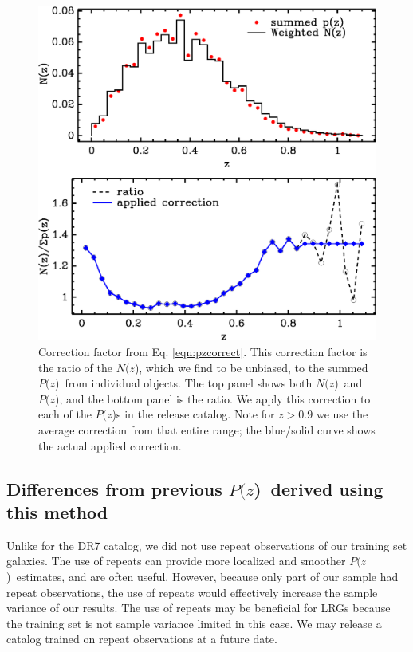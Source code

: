 \documentclass[12pt,preprint]{aastex}
\newcommand{\pofz}{$P(z$)}
\newcommand{\nofz}{$N(z$)}
\begin{document}
\begin{figure}[t]\centering
    \includegraphics[scale=0.6]{figures/pofz-correct-12.eps}

    \caption{Correction factor from Eq. \ref{eqn:pzcorrect}.  This correction
    factor is the ratio of the \nofz, which we find to be unbiased, to the
    summed \pofz\ from individual objects. The top panel shows both \nofz\ and
    \pofz, and the bottom panel is the ratio.  We apply this correction to each
    of the \pofz s in the release catalog.  Note for $z > 0.9$ we use the
    average correction from that entire range; the blue/solid curve shows the
    actual applied correction.}

    \label{fig:pzcorr}
    \vspace{2em}
\end{figure}

\subsection{Differences from previous \pofz\ derived using this method}

Unlike for the DR7 catalog, we
did not use repeat observations of our training set galaxies.  The use of
repeats can provide more localized and smoother \pofz\ estimates, and are often
useful.  However, because only part of our sample had repeat observations, the
use of repeats would effectively increase the sample variance of our results.
The use of repeats may be beneficial for LRGs because the training set is not
sample variance limited in this case.  We may release a catalog trained on
repeat observations at a future date.  
\end{document}
